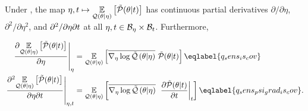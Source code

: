 



\begin{lem}

Under , the map $\eta, t \mapsto \underset{\mathcal{Q}(\theta
\vert \eta)}{\mathbb{E}}\left[\tilde{\mathcal{P}}(\theta \vert t)\right]$ has continuous partial derivatives
$\partial / \partial \eta$, $\partial^2 / \partial \eta^2$, and $\partial^2 /
\partial \eta \partial t$ at all $\eta, t \in \mathcal{B}_\eta \times \mathcal{B}_t$.
Furthermore,

\begin{align}
\fracat{\partial \expect{\q(\theta \vert \eta)}
              {\ptil(\theta \vert \t)}}{\partial \eta}{\eta}
={}&
\expect{\q(\theta \vert \eta)}
       {\lqgradbar{\theta \vert \eta}
       \ptil(\theta \vert \t)}
       \eqlabel{q_sens_is_cov}\\
%
\fracat{\partial^2 \expect{\q(\theta \vert \eta)}
      {\ptil(\theta \vert \t)}}{\partial \eta \partial \t}{\eta, \t}
={}&
\expect{\q(\theta \vert \eta)}
       {\lqgradbar{\theta \vert \eta}
       \fracat{\partial \ptil(\theta \vert \t)}{\partial \t}{\t}}
\eqlabel{q_sens_psi_grad_is_cov}.
\end{align}


\end{lem}
